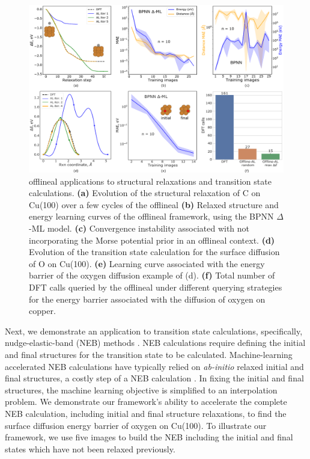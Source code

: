 \documentclass[%
 reprint,
 amsmath,amssymb,
 aps,
]{revtex4-2}
\begin{document}
\begin{figure}[ht]
    \centering
    \includegraphics[width=\textwidth]{figures/figure_3.pdf}
    \caption{ \gls{offlineal} applications to structural relaxations and transition state calculations. \textbf{(a)} Evolution of the structural relaxation of C on Cu(100) over a few cycles of the \gls{offlineal} \textbf{(b)} Relaxed structure and energy learning curves of the \gls{offlineal} framework, using the BPNN $\Delta$-ML model. \textbf{(c)} Convergence instability associated with not incorporating the Morse potential prior in an \gls{offlineal} context. \textbf{(d)} Evolution of the transition state calculation for the surface diffusion of O on Cu(100).  \textbf{(e)} Learning curve associated with the energy barrier of the oxygen diffusion example of (d). \textbf{(f)} Total number of DFT calls queried by the \gls{offlineal} under different querying strategies for the energy barrier associated with the diffusion of oxygen on copper.
    }
    
    \label{fig:al_relax}
\end{figure}


Next, we demonstrate an application to transition state calculations, specifically, nudge-elastic-band (NEB) methods \cite{Henkelman2000, Henkelman2000_2}. NEB calculations require defining the initial and final structures for the transition state to be calculated. Machine-learning accelerated NEB calculations have typically relied on \textit{ab-initio} relaxed initial and final structures, a costly step of a NEB calculation \cite{Ang2020}. In fixing the initial and final structures, the machine learning objective is simplified to an interpolation problem. We demonstrate our framework's ability to accelerate the complete NEB calculation, including initial and final structure relaxations, to find the surface diffusion energy barrier of oxygen on Cu(100). To illustrate our framework, we use five images to build the NEB including the initial and final states which have not been relaxed previously. 
\end{document}
